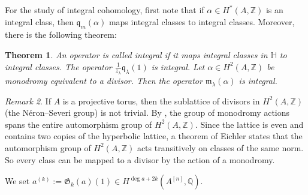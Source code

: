 \documentclass{amsart}
\newcommand{\hilb}[1]{^{[#1]}}
\newcommand{\q}{\mathfrak{q}}
\renewcommand{\H}{\mathbb{H}}
\newcommand{\Q}{\mathbb{Q}}
\newcommand{\Z}{\mathbb{Z}}
\newcommand{\kq}{\mathfrak{q}}
\theoremstyle{plain}
\newtheorem{theorem}{Theorem}[section]
\theoremstyle{definition}
\theoremstyle{remark}
\newtheorem{remark}[theorem]{Remark}
\begin{document}
For the study of integral cohomology, first note that if $\alpha \in H^*(A,\Z)$ is an integral class, then $\q_{m}(\alpha) $ maps integral classes to integral classes. 
Moreover, there is the following theorem:
\begin{theorem} \cite{QinWang}
An operator is called integral if it maps integral classes in $\H$ to integral classes. The operator $\frac{1}{z_\lambda}\kq_{\lambda}(1)$ is integral. Let $\alpha \in H^2(A,\Z)$ be monodromy equivalent to a divisor. Then the operator $\mathfrak{m}_{\lambda}(\alpha)$ is integral.
\end{theorem}


\begin{remark}
If $A$ is a projective torus, then the sublattice of divisors in $H^2(A,\Z)$ (the N\'eron--Severi group) is not trivial. By \cite[Thm.~II]{Shioda}, the group of monodromy actions spans the entire automorphism group of $H^2(A,\Z)$.
Since the lattice is even and contains two copies of the hyperbolic lattice, a theorem of Eichler \cite[Prop.~3.7.3]{Scattone} states that the automorphism group of $H^2(A,\Z)$ acts transitively on classes of the same norm. So every class can be mapped to a divisor by the action of a monodromy.
\end{remark}

We set $a^{(k)} := \mathfrak{G}_k(a) (1) \in H^{\deg a + 2k}(A\hilb{n},\Q)$.
\end{document}
